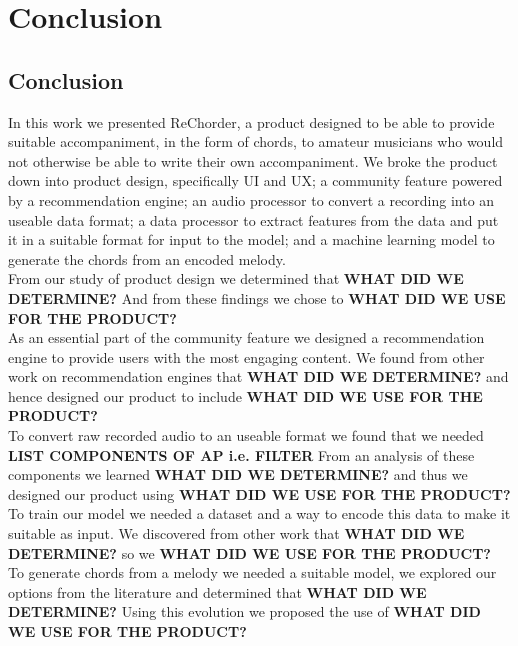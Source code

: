 


\chapter{Conclusion} %
\label{Conclusion} %

\section{Conclusion}

In this work we presented ReChorder, a product designed to be able to provide suitable accompaniment, in the form of chords, to amateur musicians who would not otherwise be able to write their own accompaniment.
We broke the product down into 
product design, specifically UI and UX; 
a community feature powered by a recommendation engine; 
an audio processor to convert a recording into an useable data format; 
a data processor to extract features from the data and put it in a suitable format for input to the model;
and a machine learning model to generate the chords from an encoded melody. 
\\
From our study of product design we determined that \textbf{WHAT DID WE DETERMINE?}
And from these findings we chose to \textbf{WHAT DID WE USE FOR THE PRODUCT?}
\\
As an essential part of the community feature we designed a recommendation engine to provide users with the most engaging content.
We found from other work on recommendation engines that  \textbf{WHAT DID WE DETERMINE?}
and hence designed our product to include \textbf{WHAT DID WE USE FOR THE PRODUCT?}
\\
To convert raw recorded audio to an useable format we found that we needed \textbf{LIST COMPONENTS OF AP i.e. FILTER}
From an analysis of these components we learned \textbf{WHAT DID WE DETERMINE?}
and thus we designed our product using \textbf{WHAT DID WE USE FOR THE PRODUCT?}
\\
To train our model we needed a dataset and a way to encode this data to make it suitable as input.
We discovered from other work that \textbf{WHAT DID WE DETERMINE?}
so we \textbf{WHAT DID WE USE FOR THE PRODUCT?}
\\
To generate chords from a melody we needed a suitable model, we explored our options from the literature and determined that \textbf{WHAT DID WE DETERMINE?}
Using this evolution we proposed the use of \textbf{WHAT DID WE USE FOR THE PRODUCT?}

